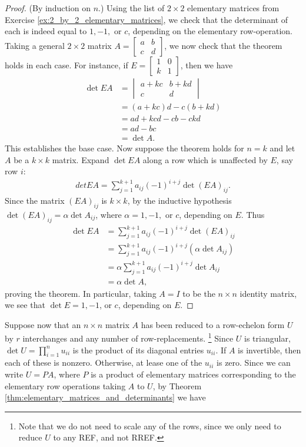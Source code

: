 \documentclass[12pt,letterpaper,reqno]{article}
\numberwithin{equation}{section}
\begin{document}
\begin{proof}
(By induction on $n$.) Using the list of $2 \times 2$ elementary matrices from Exercise \ref{ex:2_by_2_elementary_matrices}, we check that the determinant of each is indeed equal to $1,-1,$ or $c$, depending on the elementary row-operation. Taking a general $2 \times 2$ matrix $A=\begin{bmatrix}
	a & b \\ c & d
\end{bmatrix}$, we now check that the theorem holds in each case. For instance, if $E=\begin{bmatrix}
	1 & 0 \\ k & 1
\end{bmatrix}$, then we have
\begin{align*}
	\det EA&=\begin{vmatrix}
		a+kc & b+kd \\
		c & d
	\end{vmatrix} \\
	&=(a+kc)d-c(b+kd) \\
	&=ad+kcd-cb-ckd \\
	&=ad-bc \\
	&=\det A.
\end{align*} 
This establishes the base case. Now suppose the theorem holds for $n=k$ and let $A$ be a $k \times k$ matrix. Expand $\det EA$ along a row which is unaffected by $E$, say row $i$:
\begin{align*}
	det EA=\sum_{j=1}^{k+1}a_{ij}(-1)^{i+j}\det (EA)_{ij}.
\end{align*}
Since the matrix $(EA)_{ij}$ is $k \times k$, by the inductive hypothesis $\det (EA)_{ij}=\alpha \det A_{ij}$, where $\alpha =1,-1,$ or $c$, depending on $E$. Thus
\begin{align*}
	\det EA &=\sum_{j=1}^{k+1}a_{ij}(-1)^{i+j}\det (EA)_{ij} \\
	&=\sum_{j=1}^{k+1}a_{ij}(-1)^{i+j}(\alpha\det A_{ij}) \\
	&=\alpha\sum_{j=1}^{k+1}a_{ij}(-1)^{i+j}\det A_{ij} \\
	&=\alpha \det A,
\end{align*}
proving the theorem. In particular, taking $A=I$ to be the $n \times n$ identity matrix, we see that $\det E=1,-1$, or $c$, depending on $E$.
\end{proof}

Suppose now that an $n \times n$ matrix $A$ has been reduced to a row-echelon form $U$ by $r$ interchanges and any number of row-replacements. \footnote{Note that we do not need to scale any of the rows, since we only need to reduce $U$ to any REF, and not RREF.} Since $U$ is triangular, $\det U=\prod_{i=1}^n u_{ii}$ is the product of its diagonal entries $u_{ii}$. If $A$ is invertible, then each of these is nonzero. Otherwise, at lease one of the $u_{ii}$ is zero. Since we can write $U=PA$, where $P$ is a product of elementary matrices corresponding to the elementary row operations taking $A$ to $U$, by Theorem \ref{thm:elementary_matrices_and_determinants} we have
\end{document}
